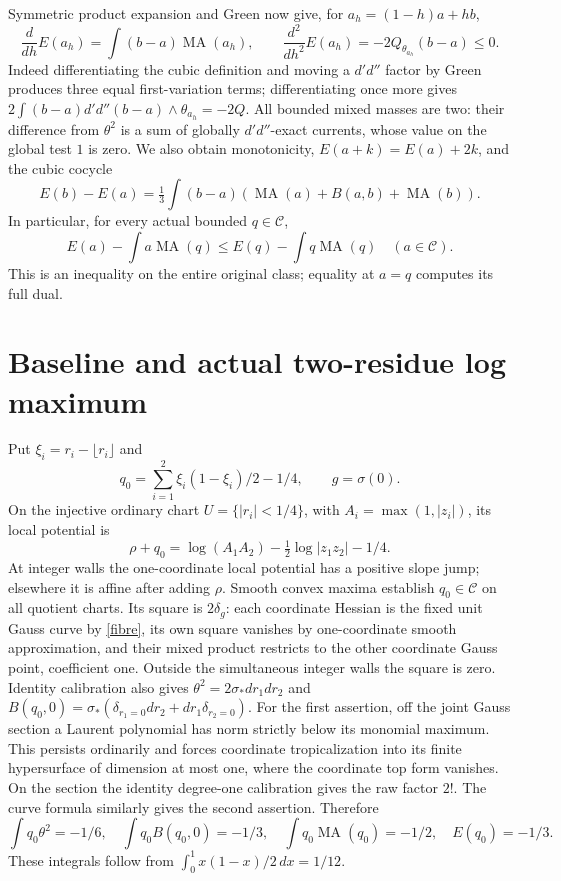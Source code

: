 \documentclass[11pt]{article}
\newcommand{\DD}{d'd''}
\newcommand{\MA}{\operatorname{MA}}
\newcommand{\C}{\mathcal C}
\begin{document}
Symmetric product expansion and Green now give, for
$a_h=(1-h)a+hb$,
\begin{equation}\label{calculus}
 \frac{d}{dh}E(a_h)=\int(b-a)\MA(a_h),\qquad
 \frac{d^2}{dh^2}E(a_h)=-2Q_{\theta_{a_h}}(b-a)\le0.
\end{equation}
Indeed differentiating the cubic definition and moving a $\DD$ factor
by Green produces three equal first-variation terms; differentiating once
more gives $2\int(b-a)\DD(b-a)\wedge\theta_{a_h}=-2Q$.
All bounded mixed masses are two: their difference from $\theta^2$ is
a sum of globally $\DD$-exact currents, whose value on the global test
$1$ is zero. We also obtain monotonicity, $E(a+k)=E(a)+2k$, and the
cubic cocycle
\[
 E(b)-E(a)=\tfrac13\int(b-a)(\MA(a)+B(a,b)+\MA(b)).
\]
In particular, for every actual bounded $q\in\C$,
\begin{equation}\label{dual}
 E(a)-\int a\MA(q)\le E(q)-\int q\MA(q)\quad(a\in\C).
\end{equation}
This is an inequality on the entire original class; equality at $a=q$
computes its full dual.

\section*{Baseline and actual two-residue log maximum}
Put $\xi_i=r_i-\lfloor r_i\rfloor$ and
\[
 q_0=\sum_{i=1}^2\xi_i(1-\xi_i)/2-1/4,
 \qquad g=\sigma(0).
\]
On the injective ordinary chart $U=\{|r_i|<1/4\}$, with
$A_i=\max(1,|z_i|)$, its local potential is
\[
 \rho+q_0=\log(A_1A_2)-\tfrac12\log|z_1z_2|-1/4.
\]
At integer walls the one-coordinate local potential has a positive
slope jump; elsewhere it is affine after adding $\rho$. Smooth convex
maxima establish $q_0\in\C$ on all quotient charts. Its square is
$2\delta_g$: each coordinate Hessian is the fixed unit Gauss curve by
\eqref{fibre}, its own square vanishes by one-coordinate smooth
approximation, and their mixed product restricts to the other coordinate
Gauss point, coefficient one. Outside the simultaneous integer walls the
square is zero. Identity calibration also gives
$\theta^2=2\sigma_*dr_1dr_2$ and
$B(q_0,0)=\sigma_*(\delta_{r_1=0}dr_2+dr_1\delta_{r_2=0})$.
For the first assertion, off the joint Gauss section a Laurent polynomial
has norm strictly below its monomial maximum. This persists ordinarily
and forces coordinate tropicalization into its finite hypersurface of
dimension at most one, where the coordinate top form vanishes.
On the section the identity degree-one calibration gives the raw factor
$2!$. The curve formula similarly gives the second assertion. Therefore
\[
 \int q_0\theta^2=-1/6,\quad
 \int q_0B(q_0,0)=-1/3,\quad
 \int q_0\MA(q_0)=-1/2,\quad E(q_0)=-1/3.
\]
These integrals follow from $\int_0^1x(1-x)/2\,dx=1/12$.
\end{document}
